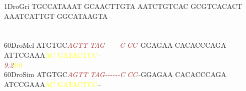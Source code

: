 \documentclass[11pt,twoside,reqno,a4paper]{article}
\begin{document}
{1\hspace*{3\charwidth}DroGri	TGCCATAAAT	GCAACTTGTA	AATCTGTCAC	GCGTCACACT	AAATCATTGT	GGCATAAGTA	\\
\hspace*{4\charwidth}\hspace*{7\charwidth}\hspace*{1\charwidth}\hspace*{1\charwidth}\hspace*{1\charwidth}\hspace*{1\charwidth}\hspace*{1\charwidth}\hspace*{1\charwidth}\\
\\
60\hspace*{2\charwidth}DroMel	ATGTGC\textit{\textcolor{Brown}{A}}\textit{\textcolor{Brown}{G}}\textit{\textcolor{Brown}{T}}\textit{\textcolor{Brown}{T}}	\textit{\textcolor{Brown}{T}}\textit{\textcolor{Brown}{A}}\textit{\textcolor{Brown}{G}}\textit{\textcolor{Brown}{-}}\textit{\textcolor{Brown}{-}}\textit{\textcolor{Brown}{-}}\textit{\textcolor{Brown}{-}}\textit{\textcolor{Brown}{-}}\textit{\textcolor{Brown}{-}}\textit{\textcolor{Brown}{C}}	\textit{\textcolor{Brown}{C}}\textit{\textcolor{Brown}{C}}--GGAGAA	CACACCCAGA	ATTCGAAA\textcolor{Yellow}{A}\textcolor{Yellow}{C}	\textcolor{Yellow}{G}\textcolor{Yellow}{A}\textcolor{Yellow}{T}\textcolor{Yellow}{A}\textcolor{Yellow}{C}\textcolor{Yellow}{T}\textcolor{Yellow}{C}\textcolor{Yellow}{C}--	\\
\hspace*{4\charwidth}\hspace*{7\charwidth}\hspace*{6\charwidth}\textit{\textcolor{Brown}{9.2}}\hspace*{1\charwidth}\hspace*{1\charwidth}\hspace*{1\charwidth}\hspace*{1\charwidth}\hspace*{39\charwidth}\textcolor{Yellow}{9.0}\hspace*{1\charwidth}\hspace*{1\charwidth}\\
60\hspace*{2\charwidth}DroSim	ATGTGC\textit{\textcolor{Brown}{A}}\textit{\textcolor{Brown}{G}}\textit{\textcolor{Brown}{T}}\textit{\textcolor{Brown}{T}}	\textit{\textcolor{Brown}{T}}\textit{\textcolor{Brown}{A}}\textit{\textcolor{Brown}{G}}\textit{\textcolor{Brown}{-}}\textit{\textcolor{Brown}{-}}\textit{\textcolor{Brown}{-}}\textit{\textcolor{Brown}{-}}\textit{\textcolor{Brown}{-}}\textit{\textcolor{Brown}{-}}\textit{\textcolor{Brown}{C}}	\textit{\textcolor{Brown}{C}}\textit{\textcolor{Brown}{C}}--GGAGAA	CACACCCAGA	ATCCGAAA\textcolor{Yellow}{A}\textcolor{Yellow}{C}	\textcolor{Yellow}{G}\textcolor{Yellow}{A}\textcolor{Yellow}{T}\textcolor{Yellow}{A}\textcolor{Yellow}{C}\textcolor{Yellow}{T}\textcolor{Yellow}{C}\textcolor{Yellow}{C}--	\\
}
\end{document}
